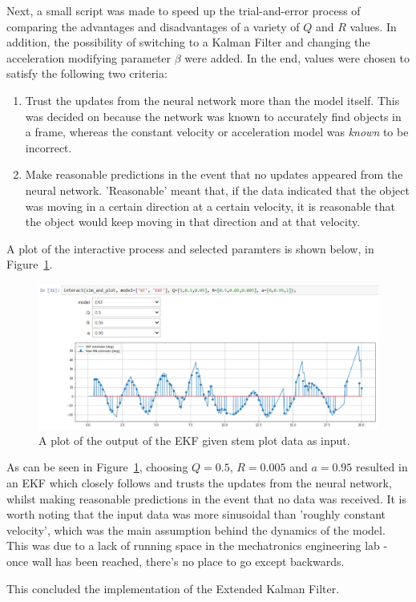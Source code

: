 Next, a small script was made to speed up the trial-and-error process of comparing the advantages and disadvantages of a variety of $Q$ and $R$ values. In addition, the possibility of switching to a Kalman Filter and changing the acceleration modifying parameter $\beta$ were added. In the end, values were chosen to satisfy the following two criteria:

\begin{enumerate}
\item Trust the updates from the neural network more than the model itself. This was decided on because the network was known to accurately find objects in a frame, whereas the constant velocity or acceleration model was \emph{known} to be incorrect.
\item Make reasonable predictions in the event that no updates appeared from the neural network. 'Reasonable' meant that, if the data indicated that the object was moving in a certain direction at a certain velocity, it is reasonable that the object would keep moving in that direction and at that velocity.
\end{enumerate}

A plot of the interactive process and selected paramters is shown below, in Figure~\ref{fig:tuning_Q_R}.

\begin{figure}[h!]
  \centering
  \includegraphics[width=\textwidth]{methodology/tuning_Q_R}
  \caption{\label{fig:tuning_Q_R} A plot of the output of the EKF given stem plot data as input.}
\end{figure}

As can be seen in Figure~\ref{fig:tuning_Q_R}, choosing $Q = 0.5$, $R = 0.005$ and $a = 0.95$ resulted in an EKF which closely follows and trusts the updates from the neural network, whilst making reasonable predictions in the event that no data was received. It is worth noting that the input data was more sinusoidal than 'roughly constant velocity', which was the main assumption behind the dynamics of the model. This was due to a lack of running space in the mechatronics engineering lab - once wall has been reached, there's no place to go except backwards.

This concluded the implementation of the Extended Kalman Filter.
